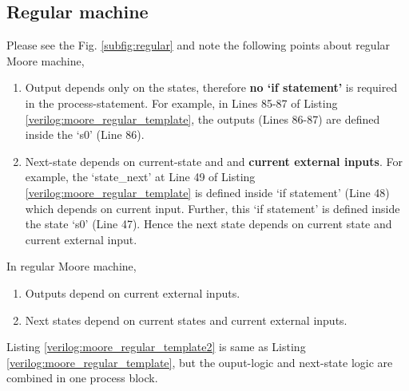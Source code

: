 \subsection{Regular machine}
Please see the Fig. \ref{subfig:regular} and note the following points about regular Moore machine, 
\begin{enumerate}
	\item Output depends only on the states, therefore \textbf{no `if statement'} is required in the process-statement. For example, in Lines 85-87 of Listing \ref{verilog:moore_regular_template}, the outputs (Lines 86-87) are defined inside the `s0' (Line 86). 
	\item Next-state depends on current-state and and  \textbf{current external inputs}. For example, the `state\_next' at Line 49 of Listing \ref{verilog:moore_regular_template} is defined inside `if statement' (Line 48) which depends on current input. Further, this `if statement' is defined inside the state `s0' (Line 47). Hence the next state depends on current state and current external input.    
\end{enumerate}

\begin{noNumBox}
	In regular Moore machine, 
	\begin{enumerate}
		\item Outputs depend on current external inputs. 
		\item Next states depend on current states and current external inputs.
	\end{enumerate}
\end{noNumBox}



Listing \ref{verilog:moore_regular_template2} is same as Listing \ref{verilog:moore_regular_template}, but the ouput-logic and next-state logic are combined in one process block. 




